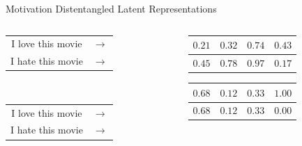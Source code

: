 \documentclass{beamer}
\begin{document}
\begin{frame}{Motivation}
	\centering
	{\Large Distentangled Latent Representations} \\
	\vspace{1cm}
	\begin{columns}[T] %
		\begin{column}{.3\textwidth}
			\centering
			\begin{tabular}{ c c }
				I love this movie & $\rightarrow$ \\
				I hate this movie & $\rightarrow$ \\
			\end{tabular} \\
			\vspace{1.8cm}
			{\color{white} \begin{tabular}{ c c }
					I love this movie & $\rightarrow$ \\
					I hate this movie & $\rightarrow$ \\
				\end{tabular}}
		\end{column}
		\hfill
		\begin{column}{.6\textwidth}
			\centering
			\begin{tabular}{ | c | c | c | c | }
				\hline
				$0.21$ & $0.32$ & $0.74$ & $0.43$ \\
				\hline
				\hline
				$0.45$ & $0.78$ & $0.97$ & $0.17$ \\
				\hline
			\end{tabular}
			{\color{white}{\Huge$$\Downarrow$$}
			\begin{tabular}{ | c | c | c | c | }
				\hline
				$0.68$ & $0.12$ & $0.33$ & $1.00$ \\
				\hline
				\hline
				$0.68$ & $0.12$ & $0.33$ & $0.00$ \\
				\hline
			\end{tabular}}
		\end{column}
	\end{columns}
\end{frame}
\end{document}
